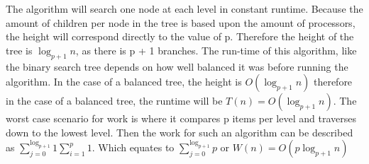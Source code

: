 \documentclass[11pt]{article}
\begin{document}
The algorithm will search one node at each level in constant runtime. Because the amount of children per node in the tree is based upon the amount of processors, the height will correspond directly to the value of p. Therefore the height of the tree is $\log_{p+1} n$, as there is p + 1 branches. The run-time of this algorithm, like the binary search tree depends on how well balanced it was before running the algorithm. In the case of a balanced tree, the height is $O(\log_{p+1} n)$ therefore in the case of a balanced tree, the runtime will be  $T(n) = O(\log_{p+1} n)$. The worst case scenario for work is where it compares p items per level and traverses down to the lowest level. Then the work for such an algorithm can be described as $\sum_{j=0}^{\log_{p+1}}1$$\sum_{i=1}^{p}1$. Which equates to $\sum_{j=0}^{\log_{p+1}}p$ or $W(n) = O(p\log_{p+1} n)$


%

\end{document}

